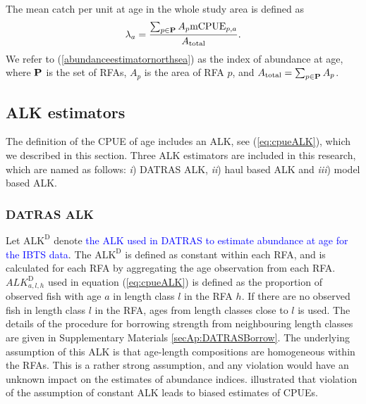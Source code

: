 \documentclass[a4paper 12pt]{article}
\numberwithin{equation}{section}
\newcommand{\ed}[1]{\textcolor{red}{#1}}
\newcommand{\nat}[1]{\textcolor{blue}{#1}}
\begin{document}
 The mean catch per unit at age in the whole study area is defined as
\begin{equation}
\lambda_{a}= \frac{\sum_{p\in {\bf P}} A_{p}  \mathrm{mCPUE}_{p,a}}{A_{\text{total}}}.
\label{abundanceestimatornorthsea}
\end{equation}
We refer to (\ref{abundanceestimatornorthsea}) as the index of abundance at age, where ${\bf P}$ is the set of RFAs, $A_p$ is the area of RFA $p$, and $A_{\text{total}} = \sum_{p\in {\bf P}} A_{p}$.
\subsection{ALK estimators}
\label{sec:alkmethods}
The definition of the CPUE of age includes an ALK, see (\ref{eq:cpueALK}), which we described in this section. Three ALK estimators are included in this research, which are named as follows:  \textit{i}) DATRAS ALK, \textit{ii}) haul based ALK and \textit{iii}) model based ALK.
\subsubsection{DATRAS ALK}
\label{sec:datrasalkestimator}
Let $\text{ALK}^{\text{D}}$ denote \nat{the ALK used in DATRAS to estimate abundance at age for the IBTS data}. The $\text{ALK}^{\text{D}}$ is defined as constant within each RFA, and is calculated for each RFA by aggregating the age observation from each RFA. $ALK^{\text{D}}_{a,l,h}$ used in equation (\ref{eq:cpueALK}) is defined as the proportion of observed fish with age $a$ in length class $l$ in the RFA $h$. If there are no observed fish in length class $l$ in the RFA, ages from length classes close to $l$ is used. The details of the procedure for borrowing strength from neighbouring length classes are given in Supplementary Materials \ref{secAp:DATRASBorrow}. The underlying assumption of this ALK  is that age-length compositions are homogeneous within the RFAs. This is a rather strong assumption, and any violation would have an unknown impact on the estimates of abundance indices. \citet{aanes2015efficient} illustrated that violation of the assumption of constant ALK leads to biased estimates of CPUEs. 
\end{document}

